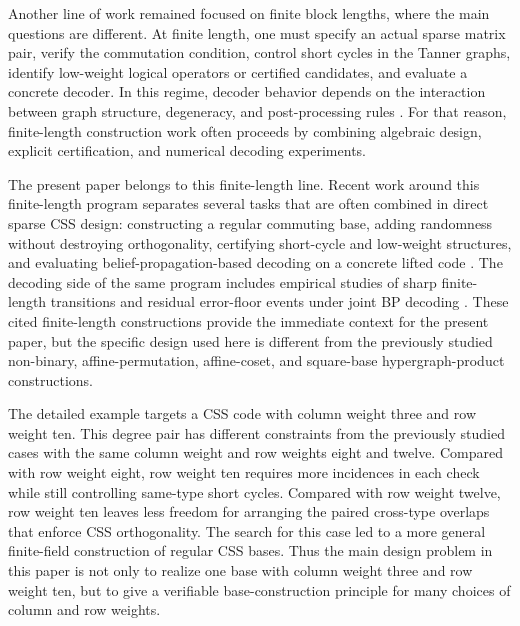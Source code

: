 \documentclass[11pt,a4paper]{article}
\theoremstyle{uprighttheorem}
\begin{document}
Another line of work remained focused on finite block lengths, where the main questions are different.
At finite length, one must specify an actual sparse matrix pair, verify the commutation condition, control short cycles in the Tanner graphs, identify low-weight logical operators or certified candidates, and evaluate a concrete decoder.
In this regime, decoder behavior depends on the interaction between graph structure, degeneracy, and post-processing rules \cite{panteleev2021degenerate,breuckmann2021qldpc}.
For that reason, finite-length construction work often proceeds by combining algebraic design, explicit certification, and numerical decoding experiments.

The present paper belongs to this finite-length line.
Recent work around this finite-length program separates several tasks that are often combined in direct sparse CSS design: constructing a regular commuting base, adding randomness without destroying orthogonality, certifying short-cycle and low-weight structures, and evaluating belief-propagation-based decoding on a concrete lifted code \cite{okada2025random,kasai2026orthogonality,kasai2026heuristic,okada2026highgirth,okada2026squarebase,kasai2026factorgraph}.
The decoding side of the same program includes empirical studies of sharp finite-length transitions and residual error-floor events under joint BP decoding \cite{komoto2025sharp}.
These cited finite-length constructions provide the immediate context for the present paper, but the specific design used here is different from the previously studied non-binary, affine-permutation, affine-coset, and square-base hypergraph-product constructions.

The detailed example targets a CSS code with column weight three and row weight ten.
This degree pair has different constraints from the previously studied cases with the same column weight and row weights eight and twelve.
Compared with row weight eight, row weight ten requires more incidences in each check while still controlling same-type short cycles.
Compared with row weight twelve, row weight ten leaves less freedom for arranging the paired cross-type overlaps that enforce CSS orthogonality.
The search for this case led to a more general finite-field construction of regular CSS bases.
Thus the main design problem in this paper is not only to realize one base with column weight three and row weight ten, but to give a verifiable base-construction principle for many choices of column and row weights.
\end{document}
